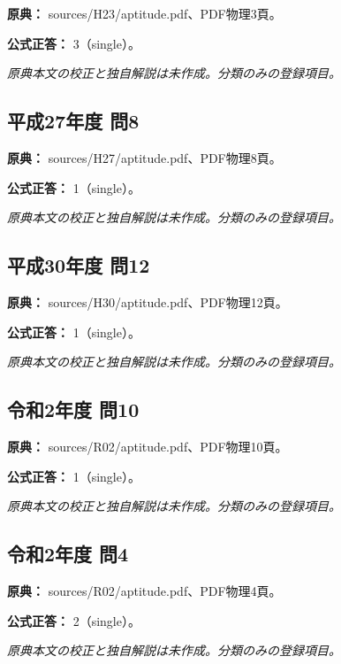 \noindent\textbf{原典：} sources/H23/aptitude.pdf、PDF物理3頁。

\textbf{公式正答：} 3（single）。

\par\textit{原典本文の校正と独自解説は未作成。分類のみの登録項目。}

\subsection{平成27年度 問8}
\label{q:h27-reg-apt-08}

\noindent\textbf{原典：} sources/H27/aptitude.pdf、PDF物理8頁。

\textbf{公式正答：} 1（single）。

\par\textit{原典本文の校正と独自解説は未作成。分類のみの登録項目。}

\subsection{平成30年度 問12}
\label{q:h30-reg-apt-12}

\noindent\textbf{原典：} sources/H30/aptitude.pdf、PDF物理12頁。

\textbf{公式正答：} 1（single）。

\par\textit{原典本文の校正と独自解説は未作成。分類のみの登録項目。}

\subsection{令和2年度 問10}
\label{q:r02-reg-apt-10}

\noindent\textbf{原典：} sources/R02/aptitude.pdf、PDF物理10頁。

\textbf{公式正答：} 1（single）。

\par\textit{原典本文の校正と独自解説は未作成。分類のみの登録項目。}

\subsection{令和2年度 問4}
\label{q:r02-reg-apt-04}

\noindent\textbf{原典：} sources/R02/aptitude.pdf、PDF物理4頁。

\textbf{公式正答：} 2（single）。

\par\textit{原典本文の校正と独自解説は未作成。分類のみの登録項目。}

